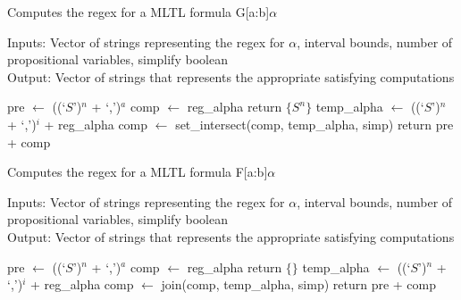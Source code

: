 \documentclass[runningheads]{llncs}
\begin{document}
\begin{algorithm}[H]
\caption{Computes the regex for a MLTL formula G[a:b]$\alpha$}
Inputs: Vector of strings representing the regex for $\alpha$, interval bounds, number of propositional variables, simplify boolean\\
Output: Vector of strings that represents the appropriate satisfying computations
\begin{algorithmic}

    \State pre $\leftarrow$ ((`$S$')$^{n}$ + `,')$^{a}$ 
    \State comp $\leftarrow$ reg\_alpha 
     
        \State return $\{S^n\}$
    \EndIf
     
        \State temp\_alpha $\leftarrow$ ((`$S$')$^{n}$ + `,')$^{i}$ + reg\_alpha
        \State comp $\leftarrow$ set\_intersect(comp, temp\_alpha, simp)
    \EndFor
    \State return pre + comp 
\EndProcedure

\end{algorithmic}
\end{algorithm}
 
\begin{algorithm}[H]
\caption{Computes the regex for a MLTL formula F[a:b]$\alpha$}
Inputs: Vector of strings representing the regex for $\alpha$, interval bounds, number of propositional variables, simplify boolean\\
Output: Vector of strings that represents the appropriate satisfying computations 
\begin{algorithmic}

    \State pre $\leftarrow$ ((`$S$')$^{n}$ + `,')$^{a}$ 
    \State comp $\leftarrow$ reg\_alpha 
     
        \State return $\{\}$
    \EndIf
     
        \State temp\_alpha $\leftarrow$ ((`$S$')$^{n}$ + `,')$^{i}$ + reg\_alpha
        \State comp $\leftarrow$ join(comp, temp\_alpha, simp)
    \EndFor
    \State return pre + comp 
\EndProcedure

\end{algorithmic}
\end{algorithm}
\end{document}
